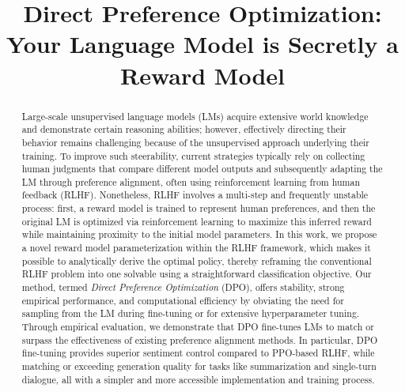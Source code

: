 \title{Direct Preference Optimization: Your Language Model is Secretly a Reward Model}

\begin{abstract}
Large-scale unsupervised language models (LMs) acquire extensive world knowledge and demonstrate certain reasoning abilities; however, effectively directing their behavior remains challenging because of the unsupervised approach underlying their training. To improve such steerability, current strategies typically rely on collecting human judgments that compare different model outputs and subsequently adapting the LM through preference alignment, often using reinforcement learning from human feedback (RLHF). Nonetheless, RLHF involves a multi-step and frequently unstable process: first, a reward model is trained to represent human preferences, and then the original LM is optimized via reinforcement learning to maximize this inferred reward while maintaining proximity to the initial model parameters. In this work, we propose a novel reward model parameterization within the RLHF framework, which makes it possible to analytically derive the optimal policy, thereby reframing the conventional RLHF problem into one solvable using a straightforward classification objective. Our method, termed \textit{Direct Preference Optimization} (DPO), offers stability, strong empirical performance, and computational efficiency by obviating the need for sampling from the LM during fine-tuning or for extensive hyperparameter tuning. Through empirical evaluation, we demonstrate that DPO fine-tunes LMs to match or surpass the effectiveness of existing preference alignment methods. In particular, DPO fine-tuning provides superior sentiment control compared to PPO-based RLHF, while matching or exceeding generation quality for tasks like summarization and single-turn dialogue, all with a simpler and more accessible implementation and training process.
\end{abstract}

